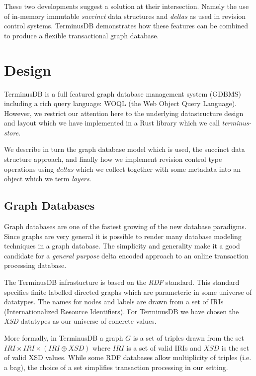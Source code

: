 \documentclass[10pt, a4paper, twocolumn]{article} %
\begin{document}
These two developments suggest a solution at their
intersection. Namely the use of in-memory immutable {\em succinct}
data structures and {\em deltas} as used in revision control
systems. TerminusDB demonstrates how these features can be combined to
produce a flexible transactional graph database.

\section{Design}

TerminusDB is a full featured graph database management system (GDBMS)
including a rich query language: WOQL (the Web Object Query Language).
However, we restrict our attention here to the underlying
datastructure design and layout which we have implemented in a
Rust\cite{Blandy:2015:RPL:3019371} library which we call {\em{terminus-store}}.

We describe in turn the graph database model which is used, the
succinct data structure approach, and finally how we implement
revision control type operations using {\em deltas} which we collect
together with some metadata into an object which we term {\em layers}.

\subsection{Graph Databases}

Graph databases are one of the fastest growing of the new database
paradigms. Since graphs are very general it is possible to render many
database modeling techniques in a graph database. The simplicity and
generality make it a good candidate for a {\em general purpose} delta
encoded approach to an online transaction processing database.

The TerminusDB infrastucture is based on the {\em RDF} standard. This
standard specifies finite labelled directed graphs which are
parameteric in some universe of datatypes. The names for nodes and
labels are drawn from a set of IRIs (Internationalized Resource
Identifiers). For TerminusDB we have chosen the {\em XSD} datatypes as
our universe of concrete values.

More formally, in TerminusDB a graph \(G\) is a set of triples drawn
from the set \( IRI \times IRI \times (IRI \oplus XSD)\) where \(IRI\)
is a set of valid IRIs and \(XSD\) is the set of valid XSD values.
While some RDF databases allow multiplicity of triples (i.e. a bag),
the choice of a set simplifies transaction processing in our setting.
\end{document}
